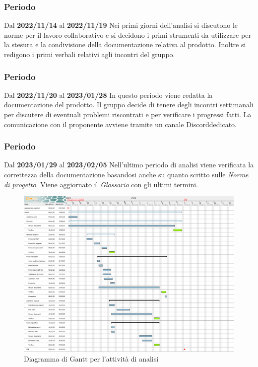 \subsubsection{ Periodo}
Dal \textbf{2022/11/14} al \textbf{2022/11/19}
\newline
Nei primi giorni dell'analisi si discutono le norme per il lavoro collaborativo e si decidono i primi strumenti da utilizzare per
la stesura e la condivisione della documentazione relativa al prodotto. Inoltre si redigono i primi verbali relativi agli incontri
del gruppo.

\subsubsection{ Periodo} 
Dal \textbf{2022/11/20} al \textbf{2023/01/28}
\newline
In questo periodo viene redatta la documentazione del prodotto. Il gruppo decide di tenere degli incontri settimanali per discutere di
eventuali problemi riscontrati e per verificare i progressi fatti. La comunicazione con il proponente avviene tramite un canale 
Discord\glo dedicato.

\subsubsection{ Periodo} 
Dal \textbf{2023/01/29} al \textbf{2023/02/05}
\newline
Nell'ultimo periodo di analisi viene verificata la correttezza della documentazione basandosi anche su quanto scritto 
sulle \textit{Norme di progetto}. Viene aggiornato il \textit{Glossario} con gli ultimi termini.

\begin{figure}[H]
    \centering
    \includegraphics[scale=0.3]{src/img/Gantt analisi.png}
    \caption{Diagramma di Gantt per l'attività di analisi}
\end{figure}

